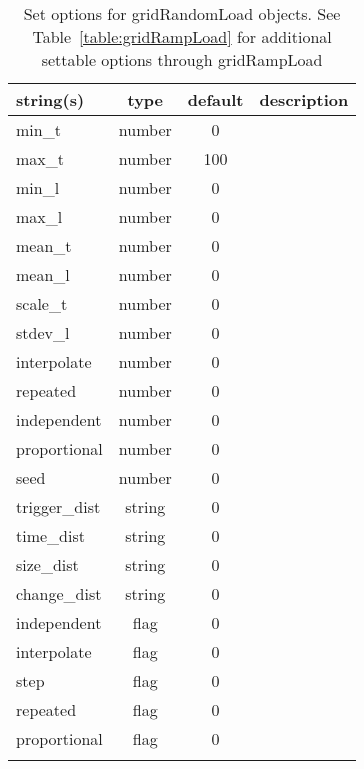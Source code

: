 \begin{longtable}{p{5cm} c c p{7cm}}
string(s) & type & default & description \\
\hline
min\_t & number & 0 & \\
max\_t & number & 100 & \\
min\_l & number & 0 & \\
max\_l & number & 0 & \\
mean\_t & number & 0 & \\
mean\_l & number & 0 & \\
scale\_t & number & 0 & \\
stdev\_l & number & 0 & \\
interpolate & number & 0 & \\
repeated & number & 0 & \\
independent & number & 0 & \\
proportional & number & 0 & \\
seed & number & 0 & \\
trigger\_dist & string & 0 & \\
time\_dist & string & 0 & \\
size\_dist & string & 0 & \\
change\_dist & string & 0 & \\
independent & flag & 0 & \\
interpolate & flag & 0 & \\
step & flag & 0 & \\
repeated & flag & 0 & \\
proportional & flag & 0 & \\
\hline
\caption{Set options for gridRandomLoad objects. See Table~\ref{table:gridRampLoad} for additional settable options through gridRampLoad}
\label{table:gridRandomLoad}
\end{longtable}
